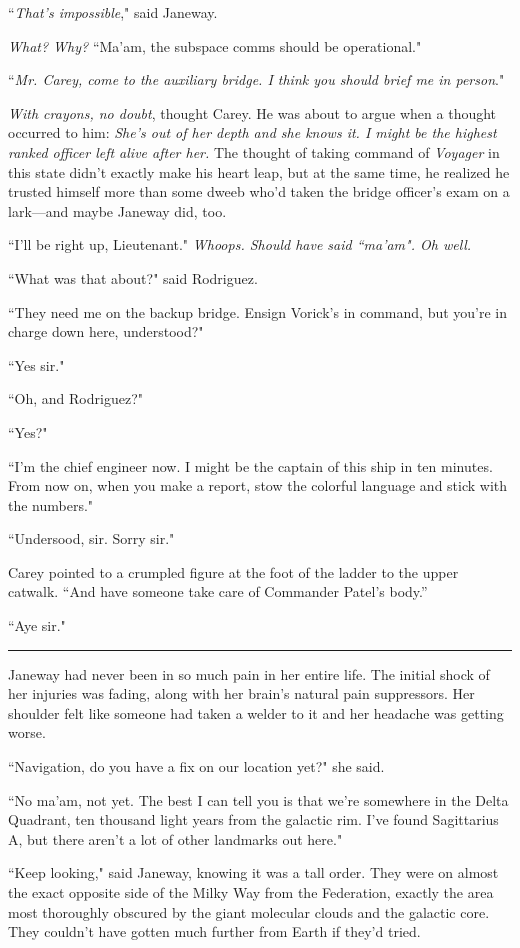 \documentclass[twoside,letterpaper,12pt]{memoir}
\begin{document}
``\textit{That's impossible}," said Janeway.

\textit{What? Why?} ``Ma'am, the subspace comms should be operational."

``\textit{Mr. Carey, come to the auxiliary bridge. I think you should brief me in person}."

\textit{With crayons, no doubt}, thought Carey. He was about to argue when a thought occurred to him: \textit{She's out of her depth and she knows it. I might be the highest ranked officer left alive after her.} The thought of taking command of \textit{Voyager} in this state didn't exactly make his heart leap, but at the same time, he realized he trusted himself more than some dweeb who'd taken the bridge officer's exam on a lark---and maybe Janeway did, too.

``I'll be right up, Lieutenant." \textit{Whoops. Should have said ``ma'am". Oh well.}

``What was that about?" said Rodriguez.

``They need me on the backup bridge. Ensign Vorick’s in command, but you’re in charge down here, understood?"

``Yes sir."

``Oh, and Rodriguez?"

``Yes?"

``I’m the chief engineer now. I might be the captain of this ship in ten minutes. From now on, when you make a report, stow the colorful language and stick with the numbers."

``Undersood, sir. Sorry sir."

Carey pointed to a crumpled figure at the foot of the ladder to the upper catwalk. ``And have someone take care of Commander Patel’s body.''

``Aye sir."

\fancybreak{\rule{3cm}{0.4 pt}}
Janeway had never been in so much pain in her entire life. The initial shock of her injuries was fading, along with her brain's natural pain suppressors. Her shoulder felt like someone had taken a welder to it and her headache was getting worse.

``Navigation, do you have a fix on our location yet?" she said.

``No ma'am, not yet. The best I can tell you is that we're somewhere in the Delta Quadrant, ten thousand light years from the galactic rim. I've found Sagittarius A, but there aren't a lot of other landmarks out here."

``Keep looking," said Janeway, knowing it was a tall order. They were on almost the exact opposite side of the Milky Way from the Federation, exactly the area most thoroughly obscured by the giant molecular clouds and the galactic core. They couldn't have gotten much further from Earth if they'd tried.
\end{document}
